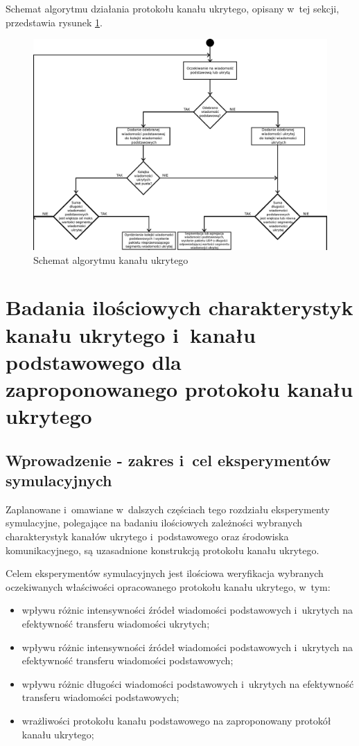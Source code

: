 \documentclass[a4paper, twoside, 12pt]{report}
\begin{document}
    Schemat algorytmu działania protokołu kanału ukrytego, opisany w~tej sekcji,
    przedstawia rysunek \ref{CHANNELALGORITHM}.

        \begin{figure}[h]
                \centering
                \includegraphics[scale=0.60, angle=90]{algorytm_kanalu_ukrytego}
                \caption{Schemat algorytmu kanału ukrytego}
                \label{CHANNELALGORITHM}
        \end{figure}

\chapter{Badania ilościowych charakterystyk kanału ukrytego i~kanału podstawowego dla zaproponowanego protokołu kanału ukrytego}
    \section{Wprowadzenie - zakres i~cel eksperymentów symulacyjnych}
    Zaplanowane i~omawiane w~dalszych częściach tego rozdziału eksperymenty symulacyjne,
    polegające na badaniu ilościowych zależności wybranych charakterystyk kanałów
    ukrytego i~podstawowego oraz środowiska komunikacyjnego, są uzasadnione konstrukcją
    protokołu kanału ukrytego.

    Celem eksperymentów symulacyjnych jest ilościowa weryfikacja wybranych oczekiwanych właściwości
    opracowanego protokołu kanału ukrytego, w~tym:
    \begin{itemize} \itemsep1pt \parskip0pt 
        \item wpływu różnic intensywności źródeł wiadomości podstawowych i~ukrytych na
            efektywność transferu wiadomości ukrytych;
        \item wpływu różnic intensywności źródeł wiadomości podstawowych i~ukrytych na
            efektywność transferu wiadomości podstawowych;
        \item wpływu różnic długości wiadomości podstawowych i~ukrytych na efektywność
            transferu wiadomości podstawowych;
        \item wrażliwości protokołu kanału podstawowego na zaproponowany protokół
            kanału ukrytego;
    \end{itemize}
\end{document}
